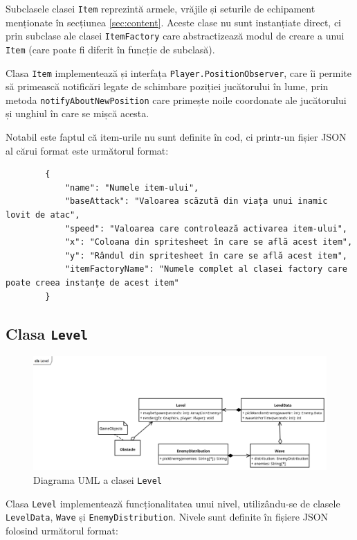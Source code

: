 \documentclass{article}
\begin{document}
    Subclasele clasei \texttt{Item} reprezintă armele, vrăjile și seturile de echipament menționate
    în secțiunea \ref{sec:content}. Aceste clase nu sunt instanțiate direct, ci prin subclase ale
    clasei \texttt{ItemFactory} care abstractizează modul de creare a unui \texttt{Item} (care
    poate fi diferit în funcție de subclasă).

    Clasa \texttt{Item} implementează și interfața \texttt{Player.PositionObserver}, care îi permite
    să primească notificări legate de schimbare poziției jucătorului în lume, prin metoda
    \texttt{notifyAboutNewPosition} care primește noile coordonate ale jucătorului și unghiul în
    care se mișcă acesta.

    Notabil este faptul că item-urile nu sunt definite în cod, ci printr-un fișier JSON al cărui
    format este următorul format:

    \begin{verbatim}
        {
            "name": "Numele item-ului",
            "baseAttack": "Valoarea scăzută din viața unui inamic lovit de atac",
            "speed": "Valoarea care controlează activarea item-ului",
            "x": "Coloana din spritesheet în care se află acest item",
            "y": "Rândul din spritesheet în care se află acest item",
            "itemFactoryName": "Numele complet al clasei factory care poate creea instanțe de acest item"
        }
    \end{verbatim}

    \subsection{Clasa \texttt{Level}}
    \begin{figure}[H]
        \includegraphics[width=\textwidth]{level-diagram}
        \centering
        \caption{Diagrama UML a clasei \texttt{Level}}
    \end{figure}

    Clasa \texttt{Level} implementează funcționalitatea unui nivel, utilizându-se de clasele
    \texttt{LevelData}, \texttt{Wave} și \texttt{EnemyDistribution}. Nivele sunt definite în fișiere
    JSON folosind următorul format:
\end{document}
